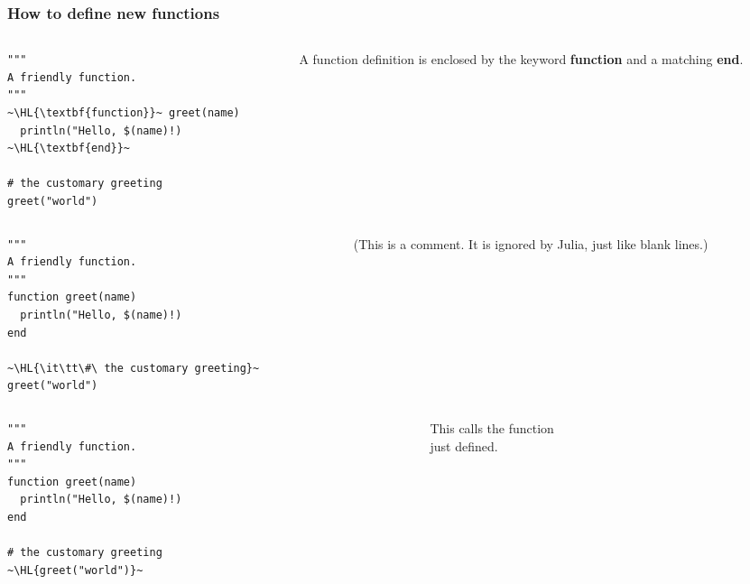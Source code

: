 \documentclass[english,serif,mathserif,xcolor=pdftex,dvipsnames,table]{beamer}
\begin{document}
\begin{frame}[fragile]
  \frametitle{How to define new functions}
  \begin{columns}[t]
    \begin{column}{0.5\textwidth}
\begin{lstlisting}
"""
A friendly function.
"""
~\HL{\textbf{function}}~ greet(name)
  println("Hello, $(name)!)
~\HL{\textbf{end}}~

# the customary greeting
greet("world")
\end{lstlisting}
    \end{column}
    \begin{column}{0.5\textwidth}
      \raggedleft
      A function definition is enclosed by the keyword \textbf{function} and a matching \textbf{end}.
    \end{column}
  \end{columns}
\end{frame}


\begin{frame}[fragile]
  \begin{columns}[t]
    \begin{column}{0.5\textwidth}
\begin{lstlisting}
"""
A friendly function.
"""
function greet(name)
  println("Hello, $(name)!)
end

~\HL{\it\tt\#\ the customary greeting}~
greet("world")
\end{lstlisting}
    \end{column}
    \begin{column}{0.5\textwidth}
      \raggedleft
       (This is a comment. It is ignored by Julia, just like blank lines.)
    \end{column}
  \end{columns}
\end{frame}


\begin{frame}[fragile]
  \begin{columns}[t]
    \begin{column}{0.5\textwidth}
\begin{lstlisting}
"""
A friendly function.
"""
function greet(name)
  println("Hello, $(name)!)
end

# the customary greeting
~\HL{greet("world")}~
\end{lstlisting}
    \end{column}
    \begin{column}{0.5\textwidth}
      \raggedleft
      This calls the function \\ just defined.
    \end{column}
  \end{columns}
\end{frame}
\end{document}
